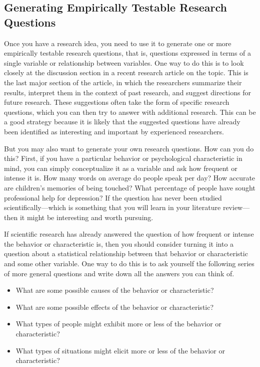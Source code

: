 \documentclass[
]{krantz}
\providecommand{\tightlist}{%
  \setlength{\itemsep}{0pt}\setlength{\parskip}{0pt}}
\begin{document}
\subsection*{Generating Empirically Testable Research Questions}\label{generating-empirically-testable-research-questions}


Once you have a research idea, you need to use it to generate one or more empirically testable research questions, that is, questions expressed in terms of a single variable or relationship between variables. One way to do this is to look closely at the discussion section in a recent research article on the topic. This is the last major section of the article, in which the researchers summarize their results, interpret them in the context of past research, and suggest directions for future research. These suggestions often take the form of specific research questions, which you can then try to answer with additional research. This can be a good strategy because it is likely that the suggested questions have already been identified as interesting and important by experienced researchers.

But you may also want to generate your own research questions. How can you do this? First, if you have a particular behavior or psychological characteristic in mind, you can simply conceptualize it as a variable and ask how frequent or intense it is. How many words on average do people speak per day? How accurate are children's memories of being touched? What percentage of people have sought professional help for depression? If the question has never been studied scientifically---which is something that you will learn in your literature review---then it might be interesting and worth pursuing.

If scientific research has already answered the question of how frequent or intense the behavior or characteristic is, then you should consider turning it into a question about a statistical relationship between that behavior or characteristic and some other variable. One way to do this is to ask yourself the following series of more general questions and write down all the answers you can think of.

\begin{itemize}
\tightlist
\item
  What are some possible causes of the behavior or characteristic?
\item
  What are some possible effects of the behavior or characteristic?
\item
  What types of people might exhibit more or less of the behavior or characteristic?
\item
  What types of situations might elicit more or less of the behavior or characteristic?
\end{itemize}
\end{document}
